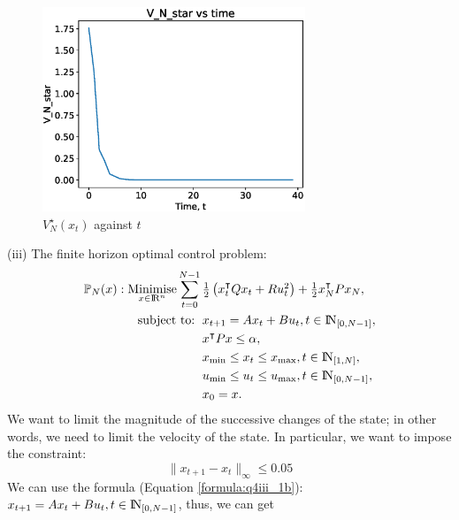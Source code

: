 \documentclass[a4paper,11pt,reqno]{amsart}
\newcommand{\R}{{\rm I\!R}}
\newcommand{\N}{{\rm I\!N}}
\newcommand{\tran}{\intercal}
\DeclareMathOperator*{\minimise}{Minimise}
\begin{document}
\begin{figure}[H]
    \centering
    \includegraphics[width=0.7\textwidth]{figures/q4_ii.eps}
    \caption{$V^{\star}_{N}(x_t)$ against $t$}
    \label{fig:q4_ii}
\end{figure}
(iii)
The finite horizon optimal control problem:
\begin{subequations}
    \begin{align}
        \mathbb{P}_N(x): \minimise_{x\in \R^n}\sum_{t=0}^{N-1}\, 
        & \textstyle\frac{1}{2}\left(x_t^{\tran}Qx_t+Ru^2_t\right)+\frac{1}{2}x_N^{\tran}Px_N,
        \\
        \text{subject to: }\,
        & x_{t+1} = A x_t + B u_t, t\in\N_{[0, N-1]}, \label{formula:q4iii_1b}
        \\
        & x^{\tran}Px\leq \alpha,
        \\
        & x_{\mathrm{min}}\leq x_t\leq x_{\mathrm{max}}, t \in \N_{[1, N]},
        \\
        & u_{\mathrm{min}}\leq u_t\leq u_{\mathrm{max}}, t \in \N_{[0, N-1]},
        \\
        & x_{0} = x.
    \end{align}
\end{subequations}
We want to limit the magnitude of the successive changes of the state; in other
words, we need to limit the velocity of the state. In particular, we want to impose the constraint:
$$\|x_{t+1}-x_t\|_{\infty}\leq 0.05$$
We can use the formula (Equation \ref{formula:q4iii_1b}): $x_{t+1} = A x_t + B u_t, t\in\N_{[0, N-1]}$, thus, we can get
\end{document}

